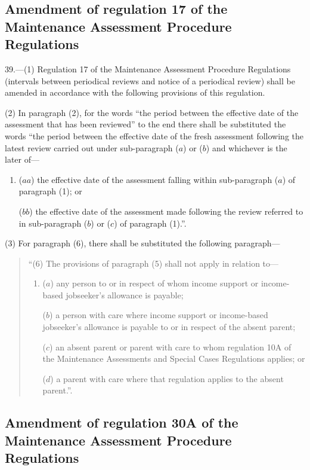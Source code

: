 \documentclass[12pt,a4paper]{article}
\begin{document}
\subsection[39. Amendment of regulation 17 of the Maintenance Assessment Procedure Regulations]{Amendment of regulation 17 of the Maintenance Assessment Procedure Regulations}

39.—(1) Regulation 17 of the Maintenance Assessment Procedure Regulations (intervals between periodical reviews and notice of a periodical review) shall be amended in accordance with the following provisions of this regulation.

(2) In paragraph (2), for the words “the period between the effective date of the assessment that has been reviewed” to the end there shall be substituted the words
“the period between the effective date of the fresh assessment following the latest review carried out under sub-paragraph ($a$) or ($b$) and whichever is the later of—
\begin{enumerate}\item[]
($aa$) the effective date of the assessment falling within sub-paragraph ($a$) of paragraph (1); or

($bb$) the effective date of the assessment made following the review referred to in sub-paragraph ($b$) or ($c$) of paragraph (1).”.
\end{enumerate}

(3) For paragraph (6), there shall be substituted the following paragraph—
\begin{quotation}
“(6) The provisions of paragraph (5) shall not apply in relation to—
\begin{enumerate}\item[]
($a$) any person to or in respect of whom income support or income-based jobseeker’s allowance is payable;

($b$) a person with care where income support or income-based jobseeker’s allowance is payable to or in respect of the absent parent;

($c$) an absent parent or parent with care to whom regulation 10A of the Maintenance Assessments and Special Cases Regulations applies; or

($d$) a parent with care where that regulation applies to the absent parent.”.
\end{enumerate}
\end{quotation}

\subsection[40. Amendment of regulation 30A of the Maintenance Assessment Procedure Regulations]{Amendment of regulation 30A of the Maintenance Assessment Procedure Regulations}
\end{document}
